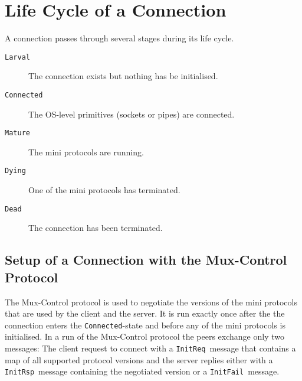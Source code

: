 \documentclass{report}
\newcommand{\state}[1]{\texttt{#1}}
\newcommand{\msg}[1]{\texttt{#1}}
\theoremstyle{definition}{
  \newtheorem{lemma}{Lemma}[section] %
  \newtheorem{definition}[lemma]{Definition}
}
\theoremstyle{theorem}{
  \newtheorem{invariant}[lemma]{Invariant}
  \newtheorem{proofobligation}[lemma]{Proof Obligation}
}
\numberwithin{equation}{lemma}
\begin{document}
\newcommand{\Larval}{\state{Larval}}
\newcommand{\Connected}{\state{Connected}}
\newcommand{\Mature}{\state{Mature}}
\newcommand{\Dying}{\state{Dying}}
\newcommand{\Dead}{\state{Dead}}

\section{Life Cycle of a Connection}



A connection passes through several stages during its life cycle.
\begin{description}
\item[\Larval]    The connection exists but nothing has be initialised.
\item[\Connected] The OS-level primitives (sockets or pipes) are connected.
\item[\Mature] The mini protocols are running.
\item[\Dying]  One of the mini protocols has terminated.
\item[\Dead] The connection has been terminated.
\end{description}

\newcommand{\InitReq}{\msg{InitReq}}
\newcommand{\InitRsp}{\msg{InitRsp}}
\newcommand{\InitFail}{\msg{InitFail}}

\subsection{Setup of a Connection with the Mux-Control Protocol}
The Mux-Control protocol is used to negotiate the versions of the mini
protocols that are used by the client and the server.
It is run exactly once after the the connection enters the \Connected-state and before
any of the mini protocols is initialised.
In a run of the Mux-Control protocol the peers exchange only two messages:
The client request to connect with a \InitReq~message that contains a map of all supported protocol versions
and the server replies either with a \InitRsp~message containing the negotiated version
or a \InitFail~message.
\end{document}
